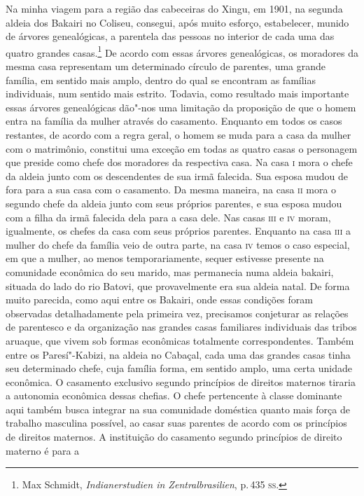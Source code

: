 Na minha viagem para a região das cabeceiras do Xingu, em 1901, na
segunda aldeia dos Bakairi no Coliseu, consegui, após muito esforço,
estabelecer, munido de árvores genealógicas, a parentela das pessoas no
interior de cada uma das quatro grandes casas.\footnote{Max Schmidt,
  \textit{Indianerstudien in Zentralbrasilien}, p.\,435 \textsc{ss}.} De acordo com
essas árvores genealógicas, os moradores da mesma casa representam um
determinado círculo de parentes, uma grande família, em sentido mais
amplo, dentro do qual se encontram as famílias individuais, num sentido
mais estrito. Todavia, como resultado mais importante essas árvores
genealógicas dão"-nos uma limitação da proposição de que o homem entra
na família da mulher através do casamento. Enquanto em todos os casos
restantes, de acordo com a regra geral, o homem se muda para a casa da
mulher com o matrimônio, constitui uma exceção em todas as quatro casas
o personagem que preside como chefe dos moradores da respectiva casa. Na
casa \textsc{i} mora o chefe da aldeia junto com os descendentes de sua irmã
falecida. Sua esposa mudou de fora para a sua casa com o casamento. Da
mesma maneira, na casa \textsc{ii} mora o segundo chefe da aldeia junto com seus
próprios parentes, e sua esposa mudou com a filha da irmã falecida dela
para a casa dele. Nas casas \textsc{iii} e \textsc{iv} moram, igualmente, os chefes da
casa com seus próprios parentes. Enquanto na casa \textsc{iii} a mulher do chefe
da família veio de outra parte, na casa \textsc{iv} temos o caso especial, em que
a mulher, ao menos temporariamente, sequer estivesse presente na
comunidade econômica do seu marido, mas permanecia numa aldeia bakairi,
situada do lado do rio Batovi, que provavelmente era sua aldeia natal.
De forma muito parecida, como aqui entre os Bakairi, onde essas
condições foram observadas detalhadamente pela primeira vez, precisamos
conjeturar as relações de parentesco e da organização nas grandes casas
familiares individuais das tribos aruaque, que vivem sob formas
econômicas totalmente correspondentes. Também entre os Paresí"-Kabizi, na
aldeia no Cabaçal, cada uma das grandes casas tinha seu determinado
chefe, cuja família forma, em sentido amplo, uma certa unidade
econômica. O casamento exclusivo segundo princípios de direitos maternos
tiraria a autonomia econômica dessas chefias. O chefe pertencente à
classe dominante aqui também busca integrar na sua comunidade doméstica
quanto mais força de trabalho masculina possível, ao casar suas
parentes de acordo com os princípios de direitos maternos. A
instituição do casamento segundo princípios de direito materno é para a
